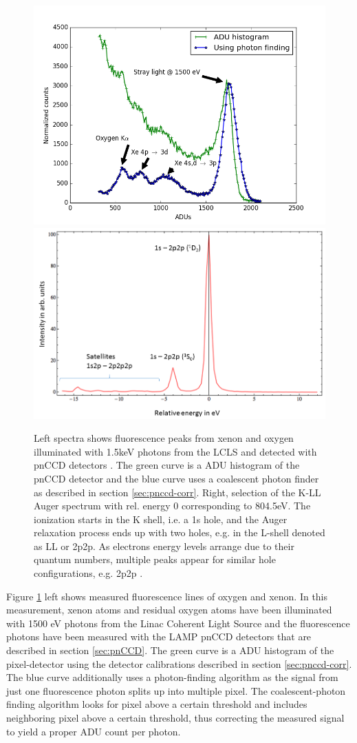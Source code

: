 \begin{figure}
	\centering
		\includegraphics[width=.49\textwidth]{images/pnCCD-histogram.png}
		\includegraphics[width=.49\textwidth]{images/auger-spectra.png}
	\caption[Fluoresence spectra from xenon and neon K-LL Auger spectrum.]{Left spectra shows fluorescence peaks from xenon and oxygen illuminated with 1.5keV photons from the LCLS and detected with pnCCD detectors \citep{Bucher-2016-Unpublished, Rudek-2012-NatPho}. The green curve is a ADU histogram of the pnCCD detector and the blue curve uses a coalescent photon finder as described in section \ref{sec:pnccd-corr}. Right, selection of the K-LL Auger spectrum with rel. energy 0 corresponding to 804.5eV. The ionization starts in the K shell, i.e. a 1s hole, and the Auger relaxation process ends up with two holes, e.g. in the L-shell denoted as LL or 2p2p. As electrons energy levels arrange due to their quantum numbers, multiple peaks appear for similar hole configurations, e.g. 2p2p \cite{Bucher-2014-Unpublished,Krause-1970-PhysLettA}.}
	\label{fig:pnCCD-histogram}
\end{figure}
Figure \ref{fig:pnCCD-histogram} left shows measured fluorescence lines of oxygen and xenon. In this measurement, xenon atoms and residual oxygen atoms have been illuminated with 1500 eV photons from the Linac Coherent Light Source and the fluorescence photons have been measured with the LAMP pnCCD detectors that are described in section \ref{sec:pnCCD}. The green curve is a ADU histogram of the pixel-detector using the detector calibrations described in section \ref{sec:pnccd-corr}. The blue curve additionally uses a photon-finding algorithm as the signal from just one fluorescence photon splits up into multiple pixel. The coalescent-photon finding algorithm looks for pixel above a certain threshold and includes neighboring pixel above a certain threshold, thus correcting the measured signal to yield a proper ADU count per photon.\\
